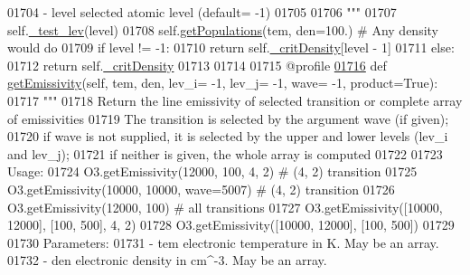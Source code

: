 \begin{DoxyCode}
{{01704 \textcolor{stringliteral}{            - level  selected atomic level (default= -1)}
01705 \textcolor{stringliteral}{}
01706 \textcolor{stringliteral}{        """}
01707         self.\hyperlink{classpyneb_1_1core_1_1pynebcore_1_1_atom_ade3de73e8bdb814d01d2d9af98eba87f}{\_test\_lev}(level)
01708         self.\hyperlink{classpyneb_1_1core_1_1pynebcore_1_1_atom_aab7496403c8aaef40ab3b20b5c00e9f0}{getPopulations}(tem, den=100.) \textcolor{comment}{# Any density would do}
01709         \textcolor{keywordflow}{if} level != -1:
01710             \textcolor{keywordflow}{return} self.\hyperlink{classpyneb_1_1core_1_1pynebcore_1_1_atom_a1d0823a36ca030fd149522fe72908631}{\_critDensity}[level - 1]
01711         \textcolor{keywordflow}{else}:
01712             \textcolor{keywordflow}{return} self.\hyperlink{classpyneb_1_1core_1_1pynebcore_1_1_atom_a1d0823a36ca030fd149522fe72908631}{\_critDensity}
01713         
01714         
01715     @profile
\hypertarget{pynebcore_8py_source_l01716}{}\hyperlink{classpyneb_1_1core_1_1pynebcore_1_1_atom_aaf4e84a9d5f835e6284bd9302314f775}{01716}     \textcolor{keyword}{def }\hyperlink{classpyneb_1_1core_1_1pynebcore_1_1_atom_aaf4e84a9d5f835e6284bd9302314f775}{getEmissivity}(self, tem, den, lev\_i= -1, lev\_j= -1, wave= -1, product=True):
01717         \textcolor{stringliteral}{"""}
01718 \textcolor{stringliteral}{        Return the line emissivity of selected transition or complete array of emissivities}
01719 \textcolor{stringliteral}{        The transition is selected by the argument wave (if given); }
01720 \textcolor{stringliteral}{        if wave is not supplied, it is selected by the upper and lower levels (lev\_i and lev\_j); }
01721 \textcolor{stringliteral}{        if neither is given, the whole array is computed}
01722 \textcolor{stringliteral}{        }
01723 \textcolor{stringliteral}{        Usage:      }
01724 \textcolor{stringliteral}{            O3.getEmissivity(12000, 100, 4, 2)         # (4, 2) transition}
01725 \textcolor{stringliteral}{            O3.getEmissivity(10000, 10000, wave=5007)  # (4, 2) transition}
01726 \textcolor{stringliteral}{            O3.getEmissivity(12000, 100)               # all transitions}
01727 \textcolor{stringliteral}{            O3.getEmissivity([10000, 12000], [100, 500], 4, 2)}
01728 \textcolor{stringliteral}{            O3.getEmissivity([10000, 12000], [100, 500])}
01729 \textcolor{stringliteral}{            }
01730 \textcolor{stringliteral}{        Parameters:}
01731 \textcolor{stringliteral}{            - tem      electronic temperature in K. May be an array.}
01732 \textcolor{stringliteral}{            - den      electronic density in cm^-3. May be an array.}
}}
\end{DoxyCode}
